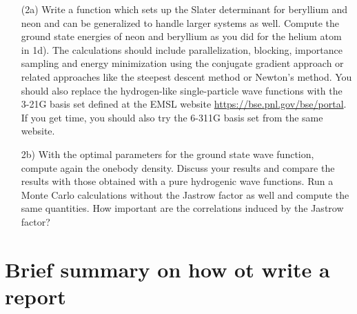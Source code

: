 \documentclass[10pt]{article}
\begin{document}
\begin{enumerate}
\item[(2a)]   Write a function which sets up the Slater determinant for beryllium and neon and can be generalized to
handle larger systems as well. 
Compute the ground state energies of neon and beryllium as you did for the helium atom
in 1d). 
The calculations should include  parallelization, blocking, importance sampling and energy minimization using the conjugate gradient approach or related approaches like the steepest descent method or Newton's method.  You should also replace the hydrogen-like single-particle wave functions with the 3-21G basis set defined 
at the EMSL website \url{https://bse.pnl.gov/bse/portal}. If you get time, you should also try the 6-311G basis set from the same website.

\item[2b)]  With the optimal parameters for the ground state wave function, compute again the onebody density. Discuss your results and compare the results with those obtained with a pure hydrogenic wave functions. Run a Monte Carlo calculations without the Jastrow factor as well
and compute the same quantities. How important are the correlations induced by the Jastrow factor?


\end{enumerate}



\section*{Brief summary on how ot write a report}
\end{document}
